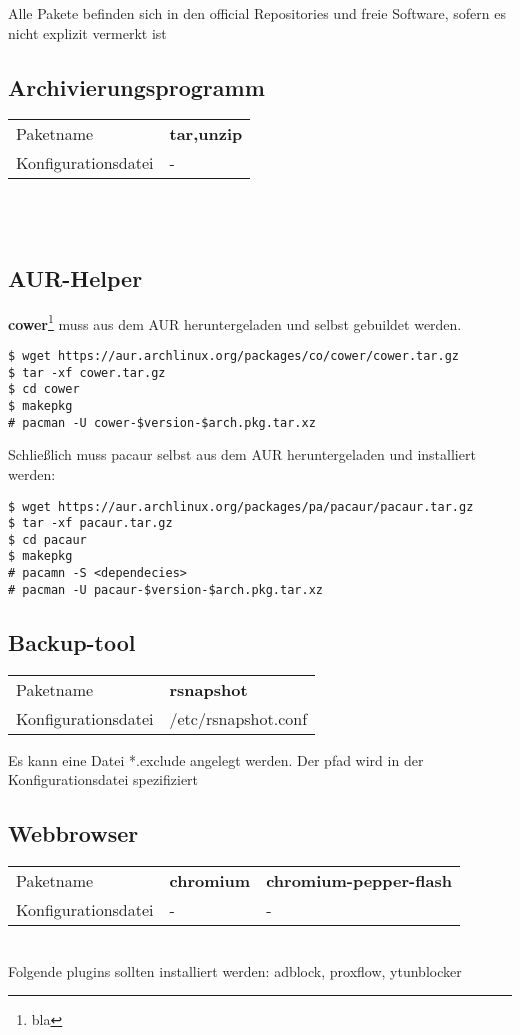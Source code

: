 Alle Pakete befinden sich in den official Repositories und freie Software,
sofern es nicht explizit vermerkt ist

\subsection{Archivierungsprogramm}
\begin{tabular}{l|l}
Paketname & \textbf{tar,unzip} \\ 
Konfigurationsdatei & - \\
\end{tabular}
\\ \\

\subsection{AUR-Helper}
\textbf{cower}\footnote{bla} muss aus dem AUR heruntergeladen und selbst gebuildet werden.
\begin{lstlisting}[style=Bash]
$ wget https://aur.archlinux.org/packages/co/cower/cower.tar.gz
$ tar -xf cower.tar.gz
$ cd cower
$ makepkg
# pacman -U cower-$version-$arch.pkg.tar.xz
\end{lstlisting}
Schließlich muss pacaur selbst aus dem AUR heruntergeladen und installiert werden:
\begin{lstlisting}[style=Bash]
$ wget https://aur.archlinux.org/packages/pa/pacaur/pacaur.tar.gz
$ tar -xf pacaur.tar.gz
$ cd pacaur
$ makepkg
# pacamn -S <dependecies>
# pacman -U pacaur-$version-$arch.pkg.tar.xz
\end{lstlisting}

\subsection{Backup-tool}
\begin{tabular}{l|l}
Paketname & \textbf{rsnapshot} \\ 
Konfigurationsdatei & /etc/rsnapshot.conf \\
\end{tabular}
Es kann eine Datei *.exclude angelegt werden. Der pfad wird in der Konfigurationsdatei spezifiziert

\subsection{Webbrowser}
\begin{tabular}{l|l|l}
Paketname & \textbf{chromium} & \textbf{chromium-pepper-flash} \\ 
Konfigurationsdatei & - & - \\
\end{tabular}
\\
Folgende plugins sollten installiert werden: adblock, proxflow, ytunblocker

